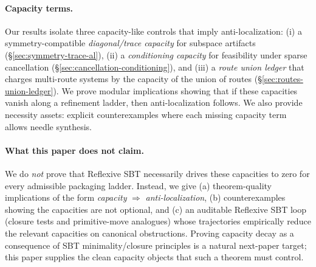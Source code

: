 \documentclass[11pt]{article}
\theoremstyle{plain}
\theoremstyle{definition}
\theoremstyle{remark}
\begin{document}
\paragraph{Capacity terms.}
Our results isolate three capacity-like controls that imply anti-localization:
(i) a symmetry-compatible \emph{diagonal/trace capacity} for subspace artifacts (\S\ref{sec:symmetry-trace-al}),
(ii) a \emph{conditioning capacity} for feasibility under sparse cancellation (\S\ref{sec:cancellation-conditioning}), and
(iii) a \emph{route union ledger} that charges multi-route systems by the capacity of the union of routes (\S\ref{sec:routes-union-ledger}).
We prove modular implications showing that if these capacities vanish along a refinement ladder, then anti-localization follows.
We also provide necessity assets: explicit counterexamples where each missing capacity term allows needle synthesis.

\paragraph{What this paper does not claim.}
We do \emph{not} prove that Reflexive SBT necessarily drives these capacities to zero for every admissible packaging ladder.
Instead, we give (a) theorem-quality implications of the form \emph{capacity} \(\Rightarrow\) \emph{anti-localization}, (b) counterexamples showing the capacities are not optional, and (c) an auditable Reflexive SBT loop (closure tests and primitive-move analogues) whose trajectories empirically reduce the relevant capacities on canonical obstructions.
Proving capacity decay as a consequence of SBT minimality/closure principles is a natural next-paper target; this paper supplies the clean capacity objects that such a theorem must control.
\end{document}
